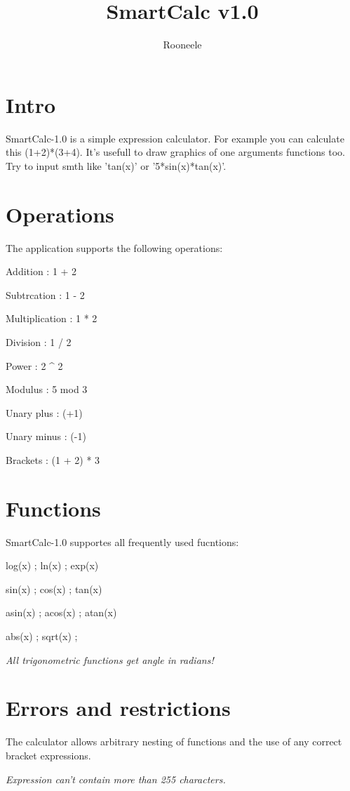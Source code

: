 \documentclass[12pt, a4paper]{report}
\title{SmartCalc v1.0}
\author{Rooneele}
\begin{document}
\maketitle

\section{Intro}
SmartCalc-1.0 is a simple expression calculator. For example
you can calculate this (1+2)*(3+4). 
It's usefull to draw graphics of one arguments functions too.
Try to input smth like 'tan(x)' or '5*sin(x)*tan(x)'.

\section{Operations}
The application supports the following operations:

Addition       : 1 + 2

Subtrcation    : 1 - 2 

Multiplication : 1 * 2

Division       : 1 / 2

Power          : 2 \^{} 2

Modulus        : 5 mod 3 

Unary plus     : (+1)

Unary minus    : (-1)

Brackets       : (1 + 2) * 3 


\section{Functions}
SmartCalc-1.0 supportes all frequently used fucntions:

log(x)  ; ln(x)   ; exp(x)  

sin(x)  ; cos(x)  ; tan(x)  

asin(x) ; acos(x) ; atan(x) 

abs(x)  ; sqrt(x) ; 

\emph{All trigonometric functions get angle in radians!}

\section{Errors and restrictions}

The calculator allows arbitrary nesting of functions 
and the use of any correct bracket expressions.

\emph{Expression can't contain more than 255 characters.}
\end{document}
